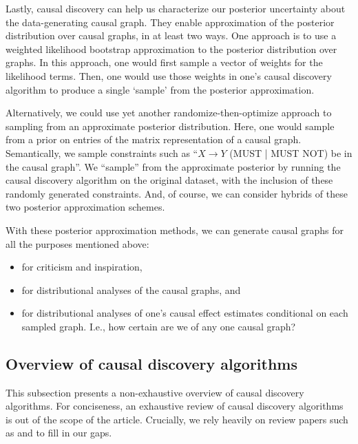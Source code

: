 Lastly, causal discovery can help us characterize our posterior uncertainty about the data-generating causal graph.
They enable approximation of the posterior distribution over causal graphs, in at least two ways.
One approach is to use a weighted likelihood bootstrap approximation \citep{newton_1994_approximate} to the posterior distribution over graphs.
In this approach, one would first sample a vector of weights for the likelihood terms.
Then, one would use those weights in one's causal discovery algorithm to produce a single `sample' from the posterior approximation.

Alternatively, we could use yet another randomize-then-optimize \citep{bardsley_2014_randomize, orabona_2014_measure} approach to sampling from an approximate posterior distribution.
Here, one would sample from a prior on entries of the matrix representation of a causal graph.
Semantically, we sample constraints such as ``$X \rightarrow Y$ (MUST | MUST NOT) be in the causal graph''.
We ``sample'' from the approximate posterior by running the causal discovery algorithm on the original dataset, with the inclusion of these randomly generated constraints.
And, of course, we can consider hybrids of these two posterior approximation schemes.

With these posterior approximation methods, we can generate causal graphs for all the purposes mentioned above:
\begin{itemize}
   \item for criticism and inspiration,
   \item for distributional analyses of the causal graphs, and
   \item for distributional analyses of one's causal effect estimates conditional on each sampled graph.\newline
   I.e., how certain are we of any one causal graph?
\end{itemize}

\subsection{Overview of causal discovery algorithms}
\label{sec:discovery-overview}

This subsection presents a non-exhaustive overview of causal discovery algorithms.
For conciseness, an exhaustive review of causal discovery algorithms is out of the scope of the article.
Crucially, we rely heavily on review papers such as \citet{glymour_2019_review} and \citet{spirtes_2016_causal} to fill in our gaps.


